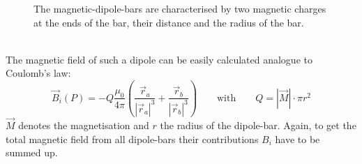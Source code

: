       \begin{figure}[h]
	\centering {}
	\caption{The magnetic-dipole-bars are characterised by two magnetic charges at the ends of the bar, their distance and the radius of the bar.}
	\label{fig:definition magnetic dipole bar}
      \end{figure}\\
      The magnetic field of such a dipole can be easily calculated analogue to Coulomb's law:
      \begin{equation}
	\vec{B}_{i}(P) = -Q \frac{\mu_0}{4\pi}\left(\frac{\vec{r}_{a}}{|\vec{r}_{a}|^3}+\frac{\vec{r}_{b}}{|\vec{r}_{b}|^3}\right) \qquad \text{with} \qquad Q = |\vec{M}| \cdot\pi r^2
      \end{equation}
      $\vec{M}$ denotes the magnetisation and $r$ the radius of the dipole-bar. Again, to get the total magnetic field from all dipole-bars their contributions $B_{i}$ have to be summed up.
